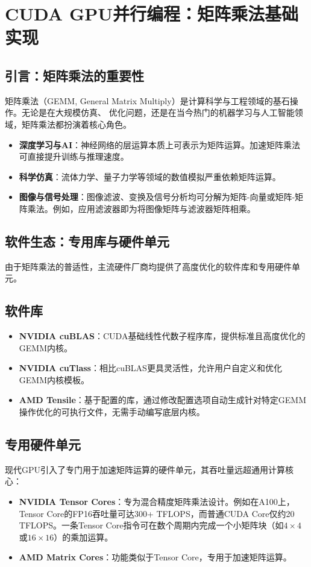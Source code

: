 \section{CUDA GPU并行编程：矩阵乘法基础实现}

\subsection{引言：矩阵乘法的重要性}

矩阵乘法（GEMM, General Matrix Multiply）是计算科学与工程领域的基石操作。无论是在大规模仿真、
优化问题，还是在当今热门的机器学习与人工智能领域，矩阵乘法都扮演着核心角色。

\begin{itemize}
    \item \textbf{深度学习与AI}：神经网络的层运算本质上可表示为矩阵运算。加速矩阵乘法可直接提升训练与推理速度。
    \item \textbf{科学仿真}：流体力学、量子力学等领域的数值模拟严重依赖矩阵运算。
    \item \textbf{图像与信号处理}：图像滤波、变换及信号分析均可分解为矩阵-向量或矩阵-矩阵乘法。例如，应用滤波器即为将图像矩阵与滤波器矩阵相乘。
\end{itemize}

\subsection{软件生态：专用库与硬件单元}

由于矩阵乘法的普适性，主流硬件厂商均提供了高度优化的软件库和专用硬件单元。

\subsection{软件库}
\begin{itemize}
    \item \textbf{NVIDIA cuBLAS}：CUDA基础线性代数子程序库，提供标准且高度优化的GEMM内核。
    \item \textbf{NVIDIA cuTlass}：相比cuBLAS更具灵活性，允许用户自定义和优化GEMM内核模板。
    \item \textbf{AMD Tensile}：基于配置的库，通过修改配置选项自动生成针对特定GEMM操作优化的可执行文件，无需手动编写底层内核。
\end{itemize}

\subsection{专用硬件单元}
现代GPU引入了专门用于加速矩阵运算的硬件单元，其吞吐量远超通用计算核心：
\begin{itemize}
    \item \textbf{NVIDIA Tensor Cores}：专为混合精度矩阵乘法设计。例如在A100上，Tensor Core的FP16吞吐量可达300+ TFLOPS，而普通CUDA Core仅约20 TFLOPS。一条Tensor Core指令可在数个周期内完成一个小矩阵块（如$4\times4$或$16\times16$）的乘加运算。
    \item \textbf{AMD Matrix Cores}：功能类似于Tensor Core，专用于加速矩阵运算。
\end{itemize}

